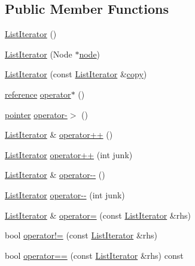 \subsection*{Public Member Functions}
\begin{DoxyCompactItemize}
\item 
\hyperlink{structprism_1_1_list_iterator_aeba4da3849b9a3515abf938157e49f71}{List\+Iterator} ()
\item 
\hyperlink{structprism_1_1_list_iterator_a9c2bd9cb3764ff98930b7714bb1a614e}{List\+Iterator} (Node $\ast$\hyperlink{structprism_1_1_list_iterator_a7cbe2359c823f13675bcc1c6bba48142}{node})
\item 
\hyperlink{structprism_1_1_list_iterator_af6c71b9766b976fe369cfdc5e11870e3}{List\+Iterator} (const \hyperlink{structprism_1_1_list_iterator}{List\+Iterator} \&\hyperlink{namespaceprism_ae776f4cd825f79e7af1cf6ee1d90a209}{copy})
\item 
\hyperlink{structprism_1_1_list_iterator_a8102dfe3c26bb09d44c54ce276debf69}{reference} \hyperlink{structprism_1_1_list_iterator_a66d9bf77483a931f5a67271a17cd0059}{operator$\ast$} ()
\item 
\hyperlink{structprism_1_1_list_iterator_a7df7f6f08916f0bbe2e0b0ce675e0cee}{pointer} \hyperlink{structprism_1_1_list_iterator_a93729cce8b4e144c3e99265f967ebc5a}{operator-\/$>$} ()
\item 
\hyperlink{structprism_1_1_list_iterator}{List\+Iterator} \& \hyperlink{structprism_1_1_list_iterator_a09ec78585eeb7f4a8b40fe7f39319bc3}{operator++} ()
\item 
\hyperlink{structprism_1_1_list_iterator}{List\+Iterator} \hyperlink{structprism_1_1_list_iterator_a386861d4219158426572921e585115d7}{operator++} (int junk)
\item 
\hyperlink{structprism_1_1_list_iterator}{List\+Iterator} \& \hyperlink{structprism_1_1_list_iterator_a8878a4fdf7c991ceebb13f8e09d51671}{operator-\/-\/} ()
\item 
\hyperlink{structprism_1_1_list_iterator}{List\+Iterator} \hyperlink{structprism_1_1_list_iterator_a29fd6a61d71c69d5ebfb86ae691fd4a3}{operator-\/-\/} (int junk)
\item 
\hyperlink{structprism_1_1_list_iterator}{List\+Iterator} \& \hyperlink{structprism_1_1_list_iterator_a6b73aadac3d160fbdf523cef078d1221}{operator=} (const \hyperlink{structprism_1_1_list_iterator}{List\+Iterator} \&rhs)
\item 
bool \hyperlink{structprism_1_1_list_iterator_a6c1830b9c6d2abc9d70d334a3b86081c}{operator!=} (const \hyperlink{structprism_1_1_list_iterator}{List\+Iterator} \&rhs)
\item 
bool \hyperlink{structprism_1_1_list_iterator_a1e0617b8f0e18f8a56515092e9f4a9b1}{operator==} (const \hyperlink{structprism_1_1_list_iterator}{List\+Iterator} \&rhs) const 
\end{DoxyCompactItemize}
